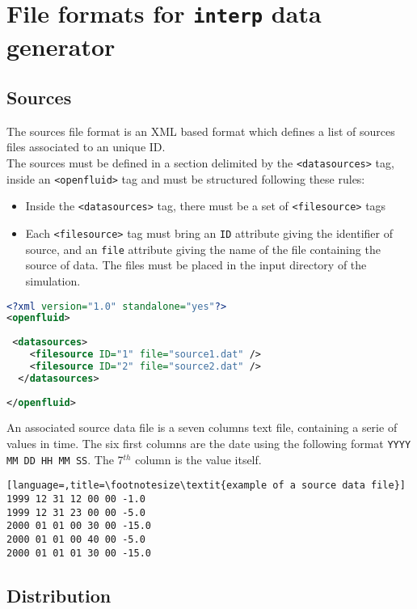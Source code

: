 \bigskip 

\section{File formats for \texttt{interp} data generator}

\subsection{Sources}
The sources file format is an XML based format which defines a list of sources
files associated to an unique ID.\\
\noindent The sources must be defined in a section delimited by the
\texttt{<datasources>} tag, inside an \texttt{<openfluid>} tag and must be
structured following these rules:
\begin{itemize}
  \item Inside the \texttt{<datasources>} tag, there must be a set of
  \texttt{<filesource>} tags
  \item Each \texttt{<filesource>} tag must bring an \texttt{ID}
  attribute giving the identifier of source, and an \texttt{file}
  attribute giving the name of the file containing the source of data. The files
  must be placed in the input directory of the simulation.
\end{itemize}

\begin{lstlisting}[language=xml,title=\footnotesize\textit{example of a sources list file}]
<?xml version="1.0" standalone="yes"?>
<openfluid>
 
 <datasources>
    <filesource ID="1" file="source1.dat" />
    <filesource ID="2" file="source2.dat" />    
  </datasources>
  
</openfluid>
\end{lstlisting}

\bigskip
An associated source data file is a seven columns text file, containing a serie
of values in time. The six first columns are the date using the following format
\texttt{YYYY MM DD HH MM SS}. The 7$^{th}$ column is the value itself.

 \begin{lstlisting}[language=,title=\footnotesize\textit{example of a source data file}]
1999 12 31 12 00 00	-1.0
1999 12 31 23 00 00	-5.0
2000 01 01 00 30 00	-15.0
2000 01 01 00 40 00	-5.0
2000 01 01 01 30 00	-15.0
\end{lstlisting}


\subsection{Distribution}

